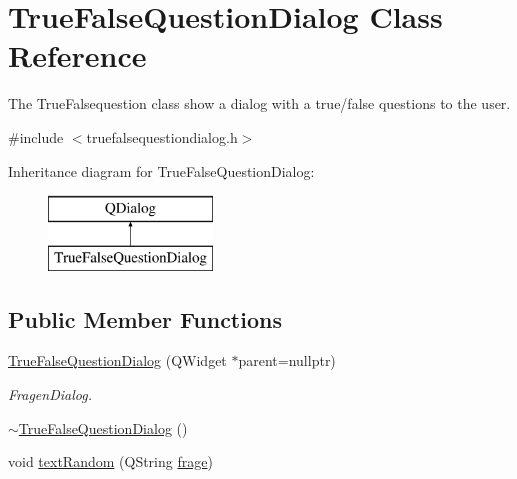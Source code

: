 \hypertarget{class_true_false_question_dialog}{}\section{True\+False\+Question\+Dialog Class Reference}
\label{class_true_false_question_dialog}


The True\+Falsequestion class show a dialog with a true/false questions to the user.  




{\ttfamily \#include $<$truefalsequestiondialog.\+h$>$}

Inheritance diagram for True\+False\+Question\+Dialog\+:\begin{figure}[H]
\begin{center}
\leavevmode
\includegraphics[height=2.000000cm]{class_true_false_question_dialog}
\end{center}
\end{figure}
\subsection*{Public Member Functions}
\begin{DoxyCompactItemize}
\item 
\mbox{\hyperlink{class_true_false_question_dialog_a850bdf7d69a11803b8d15aca1cb824d2}{True\+False\+Question\+Dialog}} (Q\+Widget $\ast$parent=nullptr)
\begin{DoxyCompactList}\small\item\em Fragen\+Dialog. \end{DoxyCompactList}\item 
\mbox{\hyperlink{class_true_false_question_dialog_a13880ffef389859e745013274e68db2f}{$\sim$\+True\+False\+Question\+Dialog}} ()
\item 
void \mbox{\hyperlink{class_true_false_question_dialog_afaebb5ffe9454a723353562edbbfc892}{text\+Random}} (Q\+String \mbox{\hyperlink{class_true_false_question_dialog_a9793a0edd3a9068536a482d1b136785c}{frage}})
\end{DoxyCompactItemize}

